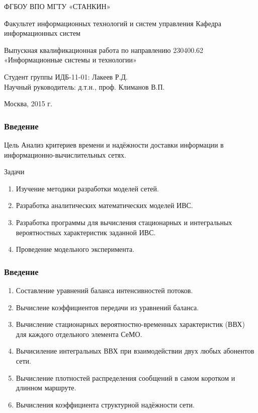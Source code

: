 \documentclass[aspectratio=43]{beamer}
\begin{document}
\begin{frame}
\begin{center}
ФГБОУ ВПО МГТУ «СТАНКИН»
 
\medskip
Факультет  информационных технологий и систем управления
Кафедра информационных систем

\medskip
Выпускная квалификационная работа
по направлению  230400.62 «Информационные системы и технологии»
\end{center}

\begin{block}{}
\end{block}

Студент группы ИДБ-11-01: Лакеев Р.Д. \\
Научный руководитель: д.т.н., проф. Климанов В.П.

\bigskip
\centerline{Москва, 2015 г.}
\end{frame}

\begin{frame}
\frametitle{Введение}

\begin{block}{Цель}
Анализ критериев времени и надёжности доставки информации в информационно-вычислительных сетях.
\end{block}

\begin{block}{Задачи}
\begin{enumerate}
	\item Изучение методики разработки моделей сетей.
	\item Разработка аналитических математических моделей ИВС.
	\item Разработка программы для вычисления стационарных и интегральных вероятностных характеристик заданной ИВС.
	\item Проведение модельного эксперимента.
\end{enumerate}
\end{block}
\end{frame}

\begin{frame}
\frametitle{Введение}

\begin{enumerate}
	\item  Составление уравнений баланса интенсивностей потоков.
	\item  Вычислеие коэффициентов передачи из уравнений баланса.
	\item  Вычисление стационарных вероятностно-временных характеристик (ВВХ) для каждого отдельного элемента СеМО.
	\item  Вычисиление интегральных ВВХ при взаимодействии двух любых абонентов сети.
	\item Вычисление плотностей распределения сообщений в самом коротком и длинном маршруте.
	\item Вычисления коэффициента структурной надёжности сети.
\end{enumerate}
\end{frame}
\end{document}
